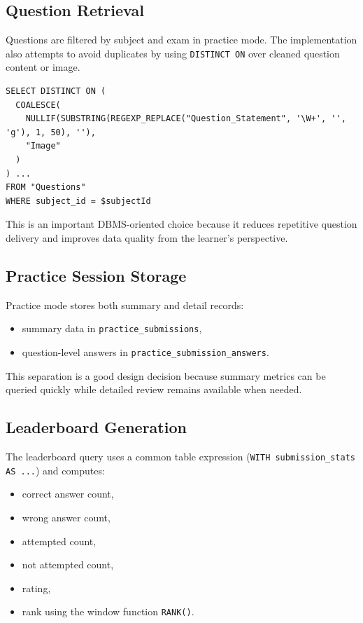 \documentclass[12pt,a4paper]{article}
\begin{document}
\subsection{Question Retrieval}
Questions are filtered by subject and exam in practice mode. The implementation also attempts to avoid duplicates by using \texttt{DISTINCT ON} over cleaned question content or image.

\begin{lstlisting}
SELECT DISTINCT ON (
  COALESCE(
    NULLIF(SUBSTRING(REGEXP_REPLACE("Question_Statement", '\W+', '', 'g'), 1, 50), ''),
    "Image"
  )
) ...
FROM "Questions"
WHERE subject_id = $subjectId
\end{lstlisting}

This is an important DBMS-oriented choice because it reduces repetitive question delivery and improves data quality from the learner's perspective.

\subsection{Practice Session Storage}
Practice mode stores both summary and detail records:

\begin{itemize}[leftmargin=1.5em]
  \item summary data in \texttt{practice\_submissions},
  \item question-level answers in \texttt{practice\_submission\_answers}.
\end{itemize}

This separation is a good design decision because summary metrics can be queried quickly while detailed review remains available when needed.

\subsection{Leaderboard Generation}
The leaderboard query uses a common table expression (\texttt{WITH submission\_stats AS ...}) and computes:

\begin{itemize}[leftmargin=1.5em]
  \item correct answer count,
  \item wrong answer count,
  \item attempted count,
  \item not attempted count,
  \item rating,
  \item rank using the window function \texttt{RANK()}.
\end{itemize}
\end{document}
